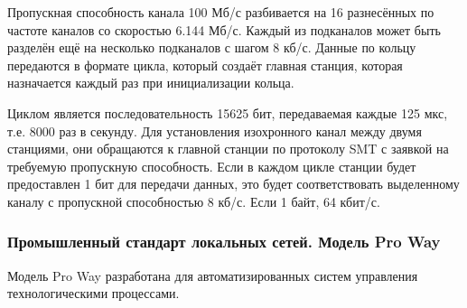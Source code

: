 \documentclass[12pt, russian, oneside, article]{ncc}
\begin{document}
\begin{itemize}
Пропускная способность канала 100 Мб/с разбивается на 16 разнесённых по частоте каналов со скоростью 6.144 Мб/с. Каждый из подканалов может быть разделён ещё на несколько подканалов с шагом 8 кб/с. Данные по кольцу передаются в формате цикла, который создаёт главная станция, которая назначается каждый раз при инициализации кольца.

Циклом является последовательность 15625  бит, передаваемая каждые 125 мкс, т.е. 8000 раз в секунду. Для установления изохронного канал между двумя станциями, они обращаются к главной станции по протоколу SMT с заявкой на требуемую пропускную способность. Если в каждом цикле станции будет предоставлен 1 бит для передачи данных, это будет соответствовать выделенному каналу с пропускной способностью 8 кб/с. Если 1 байт, 64 кбит/с.

\end{itemize} %
\subsubsection{Промышленный стандарт локальных сетей. Модель Pro Way}
\label{sec-5_2_3}


Модель Pro Way разработана для автоматизированных систем управления технологическими процессами.
\end{document}

